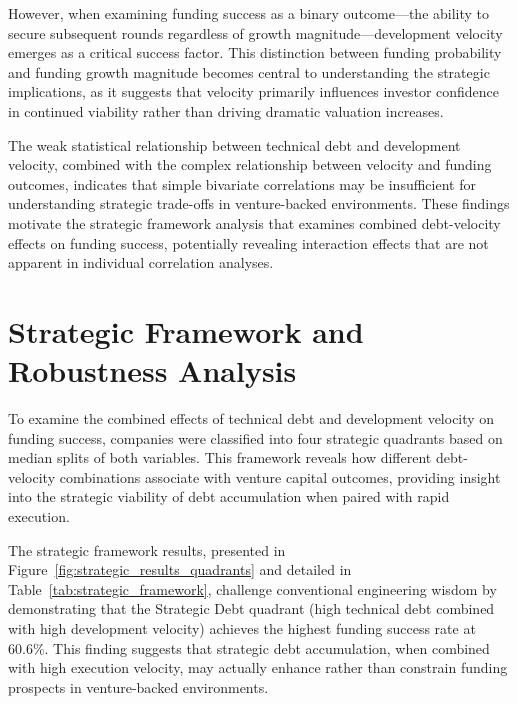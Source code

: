 However, when examining funding success as a binary outcome—the ability to secure subsequent rounds regardless of growth magnitude—development velocity emerges as a critical success factor. This distinction between funding probability and funding growth magnitude becomes central to understanding the strategic implications, as it suggests that velocity primarily influences investor confidence in continued viability rather than driving dramatic valuation increases.

The weak statistical relationship between technical debt and development velocity, combined with the complex relationship between velocity and funding outcomes, indicates that simple bivariate correlations may be insufficient for understanding strategic trade-offs in venture-backed environments. These findings motivate the strategic framework analysis that examines combined debt-velocity effects on funding success, potentially revealing interaction effects that are not apparent in individual correlation analyses.

\section{Strategic Framework and Robustness Analysis}\label{sec:strategic_framework_analysis}

To examine the combined effects of technical debt and development velocity on funding success, companies were classified into four strategic quadrants based on median splits of both variables. This framework reveals how different debt-velocity combinations associate with venture capital outcomes, providing insight into the strategic viability of debt accumulation when paired with rapid execution.

The strategic framework results, presented in Figure~\ref{fig:strategic_results_quadrants} and detailed in Table~\ref{tab:strategic_framework}, challenge conventional engineering wisdom by demonstrating that the Strategic Debt quadrant (high technical debt combined with high development velocity) achieves the highest funding success rate at 60.6\%. This finding suggests that strategic debt accumulation, when combined with high execution velocity, may actually enhance rather than constrain funding prospects in venture-backed environments.

